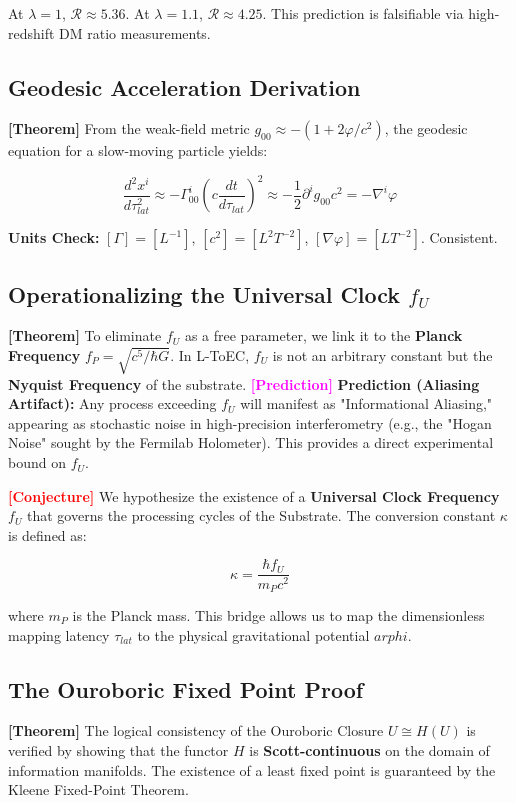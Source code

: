 \documentclass[11pt,titlepage]{article}
\newcommand{\tagtheo}{\textcolor{green!60!black}{\textbf{[Theorem]}} }
\newcommand{\tagconj}{\textcolor{red}{\textbf{[Conjecture]}} }
\newcommand{\tagpred}{\textcolor{magenta}{\textbf{[Prediction]}} }
\begin{document}
At $\lambda=1$, $\mathcal{R} \approx 5.36$. At $\lambda=1.1$, $\mathcal{R} \approx 4.25$. This prediction is falsifiable via high-redshift DM ratio measurements.

\subsection{Geodesic Acceleration Derivation}
\tagtheo From the weak-field metric $g_{00} \approx -(1 + 2\varphi/c^2)$, the geodesic equation for a slow-moving particle yields:

\begin{equation}
\frac{d^2 x^i}{d\tau_{lat}^2} \approx -\Gamma^i_{00} (c \frac{dt}{d\tau_{lat}})^2 \approx -\frac{1}{2} \partial^i g_{00} c^2 = -\nabla^i \varphi
\end{equation}

\textbf{Units Check:} $[\Gamma] = [L^{-1}]$, $[c^2] = [L^2 T^{-2}]$, $[\nabla \varphi] = [L T^{-2}]$. Consistent.


\subsection{Operationalizing the Universal Clock $f_U$}
\tagtheo To eliminate $f_U$ as a free parameter, we link it to the \textbf{Planck Frequency} $f_P = \sqrt{c^5 / \hbar G}$. In L-ToEC, $f_U$ is not an arbitrary constant but the \textbf{Nyquist Frequency} of the substrate. 
\tagpred \textbf{Prediction (Aliasing Artifact):} Any process exceeding $f_U$ will manifest as "Informational Aliasing," appearing as stochastic noise in high-precision interferometry (e.g., the "Hogan Noise" sought by the Fermilab Holometer). This provides a direct experimental bound on $f_U$.

\tagconj We hypothesize the existence of a \textbf{Universal Clock Frequency} $f_U$ that governs the processing cycles of the Substrate. The conversion constant $\kappa$ is defined as:

\begin{equation}
\kappa = \frac{\hbar f_U}{m_P c^2}
\end{equation}

where $m_P$ is the Planck mass. This bridge allows us to map the dimensionless mapping latency $\tau_{lat}$ to the physical gravitational potential $arphi$.

\subsection{The Ouroboric Fixed Point Proof}
\tagtheo The logical consistency of the Ouroboric Closure $U \cong H(U)$ is verified by showing that the functor $H$ is \textbf{Scott-continuous} on the domain of information manifolds. The existence of a least fixed point is guaranteed by the Kleene Fixed-Point Theorem.
\end{document}
